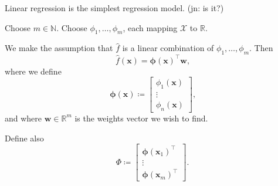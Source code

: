 \documentclass[11pt,twoside]{report}
\newcommand\bphi{\bm{\phi}}
\newcommand\bbN{\mathbb{N}}
\newcommand\bbR{\mathbb{R}}
\newcommand\bw{\mathbf{w}}
\newcommand\bx{\mathbf{x}}
\newcommand\cX{\mathcal{X}}
\newcommand\jn[1]{{\color{red}(jn: #1)}}
\begin{document}
Linear regression is the simplest regression model. \jn{is it?}

Choose $m \in \bbN$. Choose $\phi_1, \dots, \phi_m$, each mapping $\cX$ to $\bbR$.

We make the assumption that $\hat f$ is a linear combination of $\phi_1, \dots, \phi_m$. Then \[
    \hat f(\bx) = \bphi(\bx)^\top \bw \text{,}
\] where we define \[
    \bphi(\bx) \coloneqq \begin{bmatrix} \phi_1(\bx) \\ \vdots \\ \phi_n(\bx) \end{bmatrix}\text{,}
\] and where $\bw \in \bbR^m$ is the weights vector we wish to find.

Define also\[
    \Phi \coloneqq \begin{bmatrix}
        \bphi(\bx_1)^\top \\
        \vdots \\
        \bphi(\bx_m)^\top
    \end{bmatrix} \text{.}
\]
\end{document}
